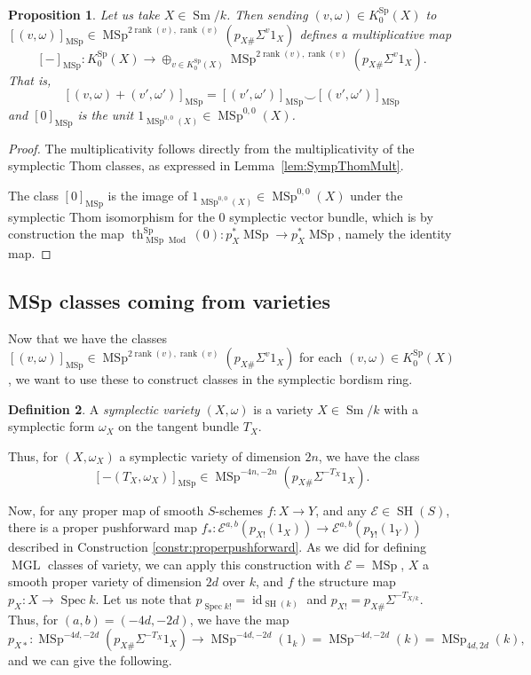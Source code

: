 \documentclass[10pt]{amsart}
\theoremstyle{definition}
\newtheorem{defn}{Definition}[section]
\theoremstyle{plain}
\newtheorem{prop}[defn]{Proposition}
\numberwithin{equation}{section}
\newcommand{\0}{\emptyset}
\newcommand{\sE}{{\mathcal E}}
\newcommand{\MGL}{{\operatorname{MGL}}}
\newcommand{\MSp}{{\operatorname{MSp}}}
\newcommand{\Sp}{{\operatorname{Sp}}}
\newcommand{\Spec}{{\operatorname{Spec}}}
\newcommand{\SH}{{\operatorname{SH}}}
\newcommand{\Sm}{{\operatorname{Sm}}}
\renewcommand{\th}{{\operatorname{th}}}
\newcommand{\Mod}{{\operatorname{Mod}}}
\newcommand{\rnk}{{\operatorname{rank}}}
\newcommand{\id}{{\operatorname{id}}}
\begin{document}
\begin{prop}\label{prop:additivity} Let us take $X\in \Sm/k$. Then sending $(v,\omega)\in K_0^\Sp(X)$ to $[(v,\omega)]_\MSp\in \MSp^{2\rnk(v), \rnk(v)}(p_{X\#}\Sigma^v1_X)$  defines a multiplicative map
\[
[-]_\MSp:K_0^\Sp(X)\to \oplus_{v\in K_0^\Sp(X)}\MSp^{2\rnk(v), \rnk(v)}(p_{X\#}\Sigma^v1_X).
\]
That is,
\[
[(v,\omega)+(v',\omega')]_\MSp=[(v',\omega')]_\MSp\smile [(v',\omega')]_\MSp
\]
and $[0]_\MSp$ is the unit $1_{\MSp^{0,0}(X)}\in \MSp^{0,0}(X)$. 
\end{prop}

\begin{proof}  The multiplicativity follows directly from the multiplicativity of the symplectic Thom classes, as expressed in Lemma~\ref{lem:SympThomMult}.

The class $[0]_\MSp$ is the image of $1_{\MSp^{0,0}(X)}\in \MSp^{0,0}(X)$ under the symplectic Thom isomorphism for the 0 symplectic vector bundle, which is by construction the map $\th^\Sp_{\MSp\Mod}(0):p_X^*\MSp\to p_X^*\MSp$, namely the identity map. 
\end{proof}

\subsection{MSp classes coming from varieties}

Now that we have the classes $[(v,\omega)]_\MSp\in \MSp^{2\rnk(v), \rnk(v)}(p_{X\#}\Sigma^v1_X)$ for each $(v,\omega)\in K_0^\Sp(X)$, we want to use these to construct classes in the symplectic bordism ring.

\begin{defn}
    A \textit{symplectic variety} $(X,\omega)$ is a variety $X\in \Sm/k$ with a symplectic form $\omega_X$ on the tangent bundle $T_X$.
\end{defn}

Thus, for $(X,\omega_X)$ a symplectic variety of dimension $2n$, we have the class
$$[-(T_X,\omega_X)]_\MSp \in \MSp^{-4n,-2n}(p_{X\#}\Sigma^{-T_X}1_X).$$

Now, for any proper map of smooth $S$-schemes $f:X \to Y$, and any $\sE \in \SH(S)$, there is a proper pushforward map $f_*:\sE^{a,b}(p_{X!}(1_X)) \to \sE^{a,b}(p_{Y!}(1_Y))$ described in Construction \ref{constr:properpushforward}. As we did for defining $\MGL$ classes of variety, we can apply this construction with $\sE=\MSp$, $X$ a smooth proper variety of dimension $2d$ over $k$, and $f$ the structure map $p_X:X\to \Spec k$. Let us note that $p_{\Spec k!}=\id_{\SH(k)}$ and $p_{X!}=p_{X\#}\Sigma^{-T_{X/k}}$. Thus, for $(a,b)=(-4d,-2d)$, we have the map
\begin{equation}
\label{eq:dualitymap}
    p_{X*}:\MSp^{-4d,-2d}(p_{X\#}\Sigma^{-T_X}1_X) \to \MSp^{-4d,-2d}(1_k)=\MSp^{-4d,-2d}(k)=\MSp_{4d,2d}(k),
\end{equation}
and we can give the following.
\end{document}
